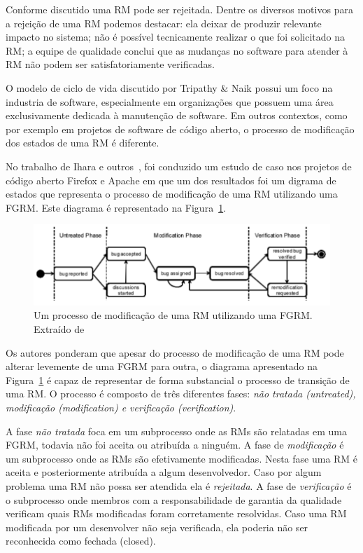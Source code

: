 Conforme discutido uma RM pode ser rejeitada. Dentre os diversos motivos para a
rejeição de uma RM podemos destacar: ela deixar de produzir relevante impacto no
sistema; não é possível tecnicamente realizar o que foi solicitado na RM\@; a
equipe de qualidade conclui que as mudanças no software para atender à RM não
podem ser satisfatoriamente verificadas.
\todoend{}


O modelo de ciclo de vida discutido por Tripathy \& Naik possui um foco na
industria de software, especialmente em organizações que possuem uma área
exclusivamente dedicada à manutenção de software. Em outros contextos, como por
exemplo em projetos de software de código aberto, o processo de modificação dos
estados de uma RM é diferente.

No trabalho de Ihara e outros~\cite{ihara2009analysis}, foi conduzido um estudo
de caso nos projetos de código aberto Firefox e Apache em que um dos resultados
foi um digrama de estados que representa o processo de modificação de uma RM
utilizando uma FGRM\@. Este diagrama é representado na
Figura~\ref{fig:diagrama-estado-rm-codigo-aberto}.

\begin{figure}[htpb]
	\centering
	\includegraphics[width=0.8\linewidth]{./chapter-manutencao-software-visao-geral/img/diagrama-estado-rm-codigo-aberto.pdf}
	\caption{Um processo de modificação de uma RM utilizando uma FGRM\@. Extraído
	de~\cite{ihara2009analysis}}
\label{fig:diagrama-estado-rm-codigo-aberto}
\end{figure}

Os autores ponderam que apesar do processo de modificação de uma RM pode alterar
levemente de uma FGRM para outra, o diagrama apresentado na
Figura~\ref{fig:diagrama-estado-rm-codigo-aberto} é capaz de representar de
forma substancial o processo de transição de uma RM\@. O processo é composto de
três diferentes fases: \textit{não tratada (untreated), modificação
	(modification) e verificação (verification)}.

A fase \textit{não tratada} foca em um subprocesso onde as RMs são relatadas em
uma FGRM, todavia não foi aceita ou atribuída a ninguém. A fase de
\textit{modificação} é um subprocesso onde as RMs são efetivamente modificadas.
Nesta fase uma RM é aceita e posteriormente atribuída a algum desenvolvedor.
Caso por algum problema uma RM não possa ser atendida ela é \textit{rejeitada}.
A fase de \textit{verificação} é o subprocesso onde membros com a
responsabilidade de garantia da qualidade verificam quais RMs modificadas foram
corretamente resolvidas. Caso uma RM modificada por um desenvolver não seja
verificada, ela poderia não ser reconhecida como fechada (closed).

